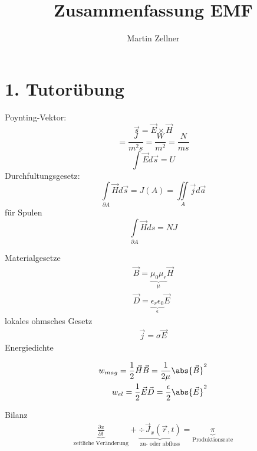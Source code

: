\documentclass[]{article}
\begin{document}
\title{Zusammenfassung EMF}
\author{Martin Zellner}

\section*{1. Tutorübung}

Poynting-Vektor: 
\begin{equation}
	\vec s = \vec E \times \vec H
\end{equation}
\begin{equation}
	[\vec s] = \frac{J}{m^2 s} = \frac{W}{m^2} = \frac{N}{m s}
\end{equation}
\begin{equation}
	\int \vec E d \vec s = U
\end{equation}
Durchfultungsgesetz:
\begin{equation}
	\int \limits_{\partial A} \vec H d \vec s = J(A) = \iint \limits_{A} \vec j d \vec a
\end{equation}
für Spulen
\begin{equation}
\int \limits_{\partial A} \vec H  d s = N J
\end{equation}

Materialgesetze
\begin{eqnarray}
	\vec B = \underbrace{\mu_0 \mu_r}_{\mu} \vec H \\
	\vec D = \underbrace{\epsilon_r \epsilon_0}_{\epsilon} \vec E
\end{eqnarray}
lokales ohmsches Gesetz
\begin{eqnarray}
	\vec j = \sigma \vec E
\end{eqnarray}
Energiedichte 

\begin{eqnarray}
	w_{mag} = \frac 1 2 \vec H \vec B = \frac{1}{2\mu} \abs{\vec B}^2 \\
	w_{el} = \frac 1 2 \vec E \vec D = \frac \epsilon 2 \abs{\vec E}^2
\end{eqnarray}

Bilanz
\begin{eqnarray}
	\underbrace{\frac{\partial x}{\partial t}}_{\text{zeitliche Veränderung}} + \underbrace{\div \vec J_x (\vec r, t)}_{\text{zu- oder abfluss}} = \underbrace{\pi}_{\text{Produktionsrate}} 
\end{eqnarray}
\end{document}
